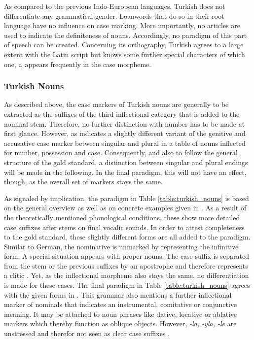 \documentclass[11pt,a4paper,twoside,openright]{scrbook}
\begin{document}
As compared to the previous Indo-European languages, Turkish does not differentiate any grammatical gender. Loanwords that do so in their root language have no influence on case marking. More importantly, no articles are used to indicate the definiteness of nouns. Accordingly, no paradigm of this part of speech can be created. Concerning its orthography, Turkish agrees to a large extent with the Latin script but knows some further special characters of which one, \foreignlanguage{turkish}{\textit{ı}}, appears frequently in the case morpheme. 



\subsubsection{Turkish Nouns}

As described above, the case markers of Turkish nouns are generally to be extracted as the suffixes of the third inflectional category that is added to the nominal stem. Therefore, no further distinction with number has to be made at first glance. However, as \citet{ersenrasch2012tuer} indicates a slightly different variant of the genitive and accusative case marker between singular and plural in a table of nouns inflected for number, possession and case. Consequently, and also to follow the general structure of the gold standard, a distinction between singular and plural endings will be made in the following. In the final paradigm, this will not have an effect, though, as the overall set of markers stays the same.

As signaled by implication, the paradigm in Table \ref{table:turkish_nouns} is based on the general overview as well as on concrete examples given in \citep{ersenrasch2012tuer}. As a result of the theoretically mentioned phonological conditions, these show more detailed case suffixes after stems on final vocalic sounds. In order to attest completeness to the gold standard, these slightly different forms are all added to the paradigm. Similar to German, the nominative is unmarked by representing the infinitive form. A special situation appears with proper nouns. The case suffix is separated from the stem or the previous suffixes by an apostrophe and therefore represents a clitic \citep{ersenrasch2012tuer}. Yet, as the inflectional morpheme also stays the same, no differentiation is made for these cases. The final paradigm in Table \ref{table:turkish_nouns} agrees with the given forms in \citep{goeksel2005tuer}. This grammar also mentions a further inflectional marker of nominals that indicates an instrumental, comitative or conjunctive meaning. It may be attached to noun phrases like dative, locative or ablative markers which thereby function as oblique objects. However, \foreignlanguage{turkish}{\textit{-la, -yla, -le}} are unstressed and therefor not seen as clear case suffixes \citep{ersenrasch2012tuer}. 
\end{document}
